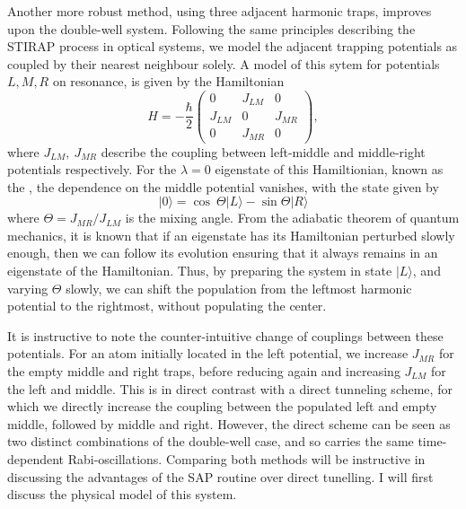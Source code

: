 Another more robust method, using three adjacent harmonic traps, improves upon the double-well system. Following the same principles describing the STIRAP process in optical systems, we model the adjacent trapping potentials as coupled by their nearest neighbour solely. A model of this sytem for potentials $L,M,R$ on resonance, is given by the Hamiltonian
\begin{equation}\label{eqn:sap_ham}
    H = -\frac{\hbar}{2}
    \begin{pmatrix}
        0 & J_{LM} & 0 \\
        J_{LM} & 0 & J_{MR} \\
        0 & J_{MR} & 0
    \end{pmatrix},
\end{equation}
where $J_{LM},~J_{MR}$ describe the coupling between left-middle and middle-right potentials respectively. For the $\lambda=0$ eigenstate of this Hamiltionian, known as the , the dependence on the middle potential vanishes, with the state given by
\begin{equation}
 | 0 \rangle = \cos\ \Theta| L \rangle - \sin \Theta | R \rangle
\end{equation}
where $\Theta=J_{MR}/J_{LM}$ is the mixing angle. From the adiabatic theorem of quantum mechanics, it is known that if an eigenstate has its Hamiltonian perturbed slowly enough, then we can follow its evolution ensuring that it always remains in an eigenstate of the Hamiltonian. Thus, by preparing the system in state $| L \rangle$, and varying $\Theta$ slowly, we can shift the population from the leftmost harmonic potential to the rightmost, without populating the center.

It is instructive to note the counter-intuitive change of couplings between these potentials. For an atom initially located in the left potential, we increase $J_{MR}$ for the empty middle and right traps, before reducing again and increasing $J_{LM}$ for the left and middle. This is in direct contrast with a direct tunneling scheme, for which we directly increase the coupling between the populated left and empty middle, followed by middle and right. However, the direct scheme can be seen as two distinct combinations of the double-well case, and so carries the same time-dependent Rabi-oscillations. Comparing both methods will be instructive in discussing the advantages of the SAP routine over direct tunelling. I will first discuss the physical model of this system.

